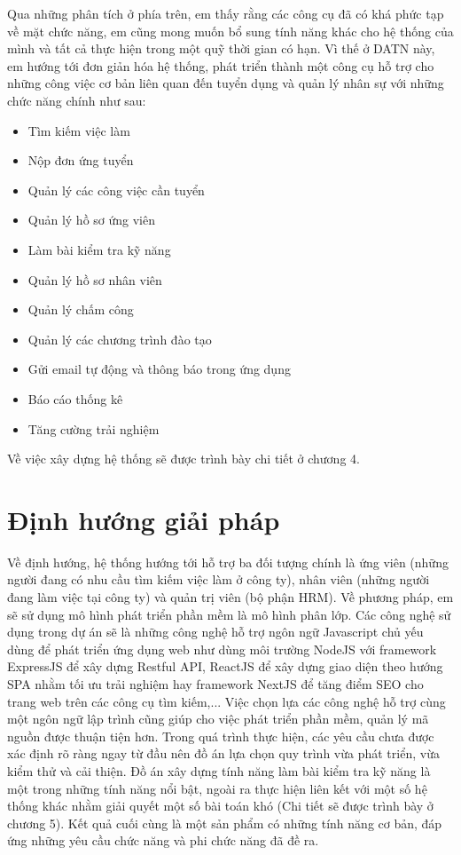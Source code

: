 \documentclass[../DoAn.tex]{subfiles}
\begin{document}
Qua những phân tích ở phía trên, em thấy rằng các công cụ đã có khá phức tạp về mặt chức năng, em cũng mong muốn bổ sung tính năng khác cho hệ thống của mình và tất cả thực hiện trong một quỹ thời gian có hạn. Vì thế ở DATN này, em hướng tới đơn giản hóa hệ thống, phát triển thành một công cụ hỗ trợ cho những công việc cơ bản liên quan đến tuyển dụng và quản lý nhân sự với những chức năng chính như sau:
\begin{itemize}
\item Tìm kiếm việc làm
\item Nộp đơn ứng tuyển
\item Quản lý các công việc cần tuyển
\item Quản lý hồ sơ ứng viên
\item Làm bài kiểm tra kỹ năng
\item Quản lý hồ sơ nhân viên
\item Quản lý chấm công
\item Quản lý các chương trình đào tạo
\item Gửi email tự động và thông báo trong ứng dụng
\item Báo cáo thống kê
\item Tăng cường trải nghiệm
\end{itemize}

Về việc xây dựng hệ thống sẽ được trình bày chi tiết ở chương 4.

\section{Định hướng giải pháp}
\label{section:1.3}

Về định hướng, hệ thống hướng tới hỗ trợ ba đối tượng chính là ứng viên (những người đang có nhu cầu tìm kiếm việc làm ở công ty), nhân viên (những người đang làm việc tại công ty) và quản trị viên (bộ phận HRM). Về phương pháp, em sẽ sử dụng mô hình phát triển phần mềm là mô hình phân lớp. Các công nghệ sử dụng trong dự án sẽ là những công nghệ hỗ trợ ngôn ngữ Javascript chủ yếu dùng để phát triển ứng dụng web như dùng môi trường NodeJS với framework ExpressJS để xây dựng Restful API, ReactJS để xây dựng giao diện theo hướng SPA nhằm tối ưu trải nghiệm hay framework NextJS để tăng điểm SEO cho trang web trên các công cụ tìm kiếm,... Việc chọn lựa các công nghệ hỗ trợ cùng một ngôn ngữ lập trình cũng giúp cho việc phát triển phần mềm, quản lý mã nguồn được thuận tiện hơn. Trong quá trình thực hiện, các yêu cầu chưa được xác định rõ ràng ngay từ đầu nên đồ án lựa chọn quy trình vừa phát triển, vừa kiểm thử và cải thiện. Đồ án xây dựng tính năng làm bài kiểm tra kỹ năng là một trong những tính năng nổi bật, ngoài ra thực hiện liên kết với một số hệ thống khác nhằm giải quyết một số bài toán khó (Chi tiết sẽ được trình bày ở chương 5). Kết quả cuối cùng là một sản phẩm có những tính năng cơ bản, đáp ứng những yêu cầu chức năng và phi chức năng đã đề ra.
\end{document}
